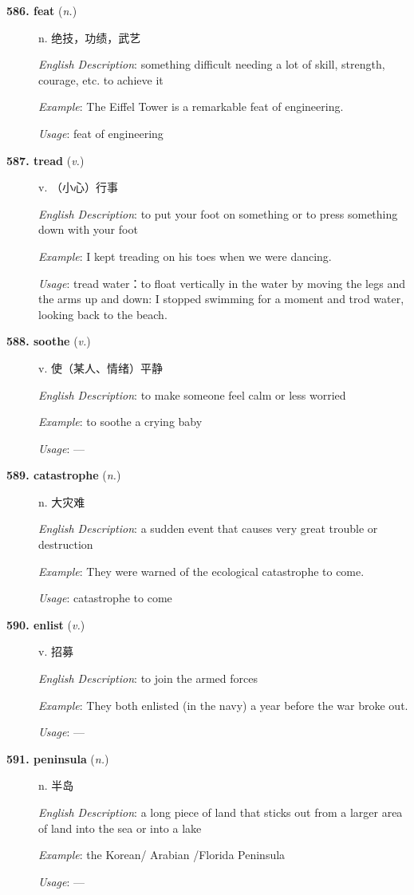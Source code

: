 \documentclass[UTF8]{ctexart}
\newcommand{\vocabentry}[7]{%
\item[\textbf{#1. #2} (\textit{#3})]
#4\par
\textit{English Description}: #5\par
\textit{Example}: #6\par
\textit{Usage}: #7
}
\begin{document}
\begin{description}
\vocabentry{586}{feat}{n.}{n. 绝技，功绩，武艺}{something difficult needing a lot of skill, strength, courage, etc. to achieve it}{The Eiffel Tower is a remarkable feat of engineering.}{feat of engineering}
\vocabentry{587}{tread}{v.}{v. （小心）行事}{to put your foot on something or to press something down with your foot}{I kept treading on his toes when we were dancing.}{tread water：to float vertically in the water by moving the legs and the arms up and down: I stopped swimming for a moment and trod water, looking back to the beach.}
\vocabentry{588}{soothe}{v.}{v. 使（某人、情绪）平静}{to make someone feel calm or less worried}{to soothe a crying baby}{—}
\vocabentry{589}{catastrophe}{n.}{n. 大灾难}{a sudden event that causes very great trouble or destruction}{They were warned of the ecological catastrophe to come.}{catastrophe to come}
\vocabentry{590}{enlist}{v.}{v. 招募}{to join the armed forces}{They both enlisted (in the navy) a year before the war broke out.}{—}
\vocabentry{591}{peninsula}{n.}{n. 半岛}{a long piece of land that sticks out from a larger area of land into the sea or into a lake}{the Korean/ Arabian /Florida Peninsula}{—}
\end{description}
\end{document}

